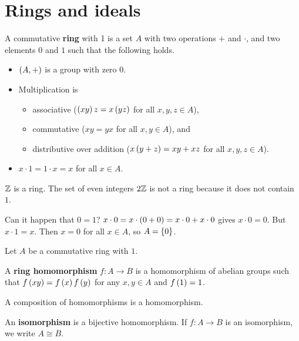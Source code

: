\section{Rings and ideals}

\begin{definition}
A commutative \textbf{ring} with 1 is a set $ A $ with two operations $ + $ and $ \cdot $, and two elements $ 0 $ and $ 1 $ such that the following holds.
\begin{itemize}
\item $ \left( A, + \right) $ is a group with zero $ 0 $.
\item Multiplication is
\begin{itemize}
\item associative ($ \left( xy \right)z = x\left( yz \right) $ for all $ x, y, z \in A $),
\item commutative ($ xy = yx $ for all $ x, y \in A $), and
\item distributive over addition ($ x\left( y + z \right) = xy + xz $ for all $ x, y, z \in A $).
\end{itemize}
\item $ x \cdot 1 = 1 \cdot x = x $ for all $ x \in A $.
\end{itemize}
\end{definition}

\begin{example*}
$ \mathbb{Z} $ is a ring. The set of even integers $ 2\mathbb{Z} $ is not a ring because it does not contain $ 1 $.
\end{example*}

\begin{remark}
Can it happen that $ 0 = 1 $? $ x \cdot 0 = x \cdot \left( 0 + 0 \right) = x \cdot 0 + x \cdot 0 $ gives $ x \cdot 0 = 0 $. But $ x \cdot 1 = x $. Then $ x = 0 $ for all $ x \in A $, so $ A = \left\{ 0 \right\} $.
\end{remark}

Let $ A $ be a commutative ring with $ 1 $.

\begin{definition}
A \textbf{ring homomorphism} $ f : A \to B $ is a homomorphism of abelian groups such that $ f\left( xy \right) = f\left( x \right)f\left( y \right) $ for any $ x, y \in A $ and $ f\left( 1 \right) = 1 $.
\end{definition}

\begin{proposition}
A composition of homomorphisms is a homomorphism.
\end{proposition}

An \textbf{isomorphism} is a bijective homomorphism. If $ f : A \to B $ is an isomorphism, we write $ A \cong B $.

